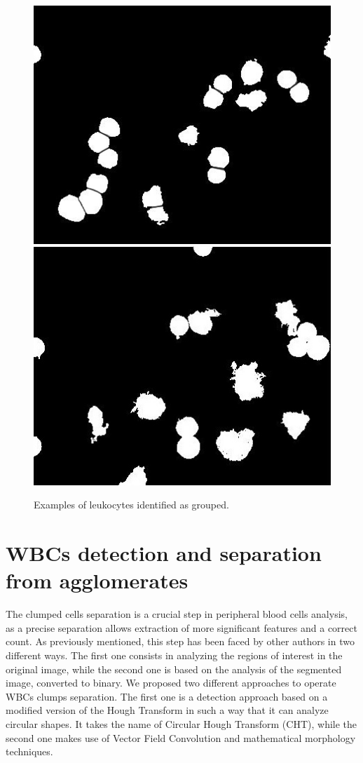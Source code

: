 \documentclass[final,a4paper,12pt,english]{UnicaPhdThesis3}
\begin{document}
{\begin{figure}[!htbp]
\centering
\includegraphics[height=0.27\textheight]{images/Fig12-1}
\includegraphics[height=0.27\textheight]{images/Fig12-2}
\caption{\label{fig:example10}Examples of leukocytes identified as grouped.}
\end{figure}

\section{WBCs detection and separation from agglomerates} %
The clumped cells separation is a crucial step in peripheral blood cells analysis, as a precise separation allows extraction of more significant features and a correct count. As previously mentioned, this step has been faced by other authors in two different ways. The first one consists in analyzing the regions of interest in the original image, while the second one is based on the analysis of the segmented image, converted to binary. We proposed two different approaches to operate WBCs clumps separation. The first one is a detection approach based on a modified version of the Hough Transform in such a way that it can analyze circular shapes. It takes the name of Circular Hough Transform (CHT), while the second one makes use of Vector Field Convolution and mathematical morphology techniques. 

}
\end{document}
